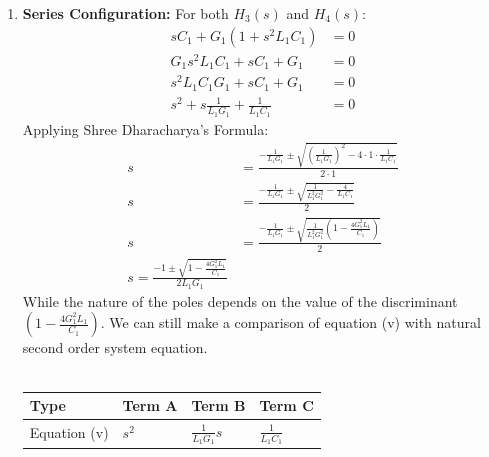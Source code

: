 \begin{enumerate}
\begin{enumerate}
\begin{enumerate}
            \begin{align*}
              \omega_n = \sqrt{\frac{1}{L_1 C_1}} \\
              f_p = \frac{\omega_n}{2\pi} = \frac{1}{2\pi \sqrt{L_1 C_1}}
            \end{align*}
          \item Damping Ratio:
            \[
              2 \zeta \omega_n = \frac{G_1}{C_1} \implies \zeta = \frac{G_1}{2C_1 \omega_n} = \frac{G_1}{2 C_1} \sqrt{L_1 C_1}
            \]
          \item Q Factor:
            \[
              Q = \frac{1}{2\zeta} = \frac{C_1}{G_1} \sqrt{\frac{1}{L_1 C_1}}
            \]
        \end{enumerate}
      \item \textbf{Series Configuration:}
        For both \(H_3(s)\) and \(H_4(s)\):
        \begin{align*}
          sC_1 + G_1(1 + s^2 L_1 C_1) &= 0 \\
          G_1 s^2 L_1 C_1 + sC_1 + G_1 &= 0 \\
          s^2 L_1 C_1 G_1 + s C_1 + G_1 &= 0 \\
          s^2 + s \frac{1}{L_1 G_1} + \frac{1}{L_1 C_1} &= 0 \tag{5}
        \end{align*}
        Applying Shree Dharacharya's Formula:
        \begin{align*}
          s &= \frac{-\frac{1}{L_1 G_1} \pm \sqrt{\left(\frac{1}{L_1 G_1}\right)^2 - 4 \cdot 1 \cdot \frac{1}{L_1 C_1}}}{2 \cdot 1} \\
          s &= \frac{-\frac{1}{L_1 G_1} \pm \sqrt{\frac{1}{L_1^2 G_1^2} - \frac{4}{L_1 C_1}}}{2} \\
          s &= \frac{-\frac{1}{L_1 G_1} \pm \sqrt{\frac{1}{L_1^2 G_1^2} \left(1 - \frac{4 G_1^2 L_1}{C_1}\right)}}{2} \\
          \boxed{s = \frac{-1 \pm \sqrt{1 - \frac{4 G_1^2 L_1}{C_1}}}{2 L_1 G_1}}
        \end{align*}
        While the nature of the poles depends on the value of the
        discriminant \(\left(1 - \frac{4 G_1^2 L_1}{C_1}\right)\).
        We can still make a comparison of equation (v) with natural
        second order system equation.\\ \\
        \begin{tabularx}{\linewidth}{|X|X|X|X|} \hline
          Type & Term A & Term B & Term C \\ \hline
          Equation (v) & \(s^2\) & \(\frac{1}{L_1 G_1} s\) & \(\frac{1}{L_1 C_1}\) \\ \hline

\end{tabularx}
\end{enumerate}
\end{enumerate}
